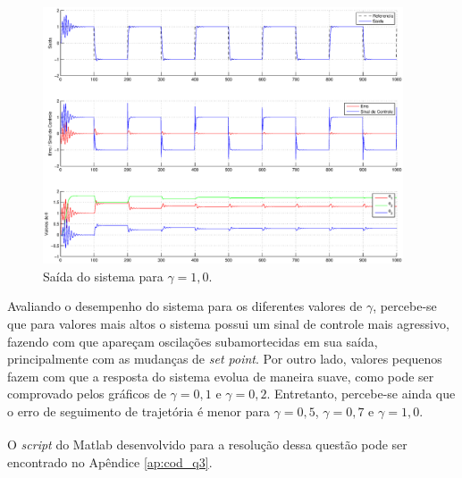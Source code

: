\begin{figure}[H]
    \centering
    \includegraphics[width=0.95\textwidth]{imgs/questao3/saida_gamma_1.0.eps}
    \caption{Saída do sistema para $\gamma = 1,0$.}
    \label{fig:q3_saida_gamma_1.0}
\end{figure}

Avaliando o desempenho do sistema para os diferentes valores de $\gamma$,
percebe-se que para valores mais altos o sistema possui um sinal de controle
mais agressivo, fazendo com que apareçam oscilações subamortecidas em sua
saída, principalmente com as mudanças de {\it set point}. Por outro lado,
valores pequenos fazem com que a resposta do sistema evolua de maneira suave,
como pode ser comprovado pelos gráficos de $\gamma = 0,1$ e $\gamma = 0,2$.
Entretanto, percebe-se ainda que o erro de seguimento de trajetória é menor para
$\gamma = 0,5$, $\gamma = 0,7$ e $\gamma = 1,0$.

O {\it script} do Matlab\textsuperscript{\textregistered} desenvolvido para a
resolução dessa questão pode ser encontrado no Apêndice \ref{ap:cod_q3}.

